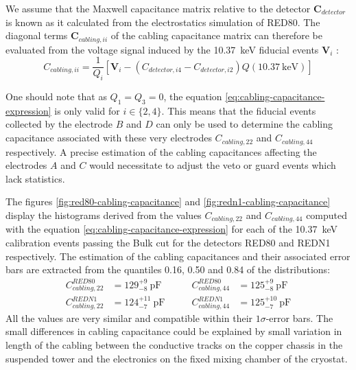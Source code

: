 We assume that the Maxwell capacitance matrix relative to the detector $\bm{C}_{detector}$ is known as it calculated from the electrostatics simulation of RED80. The diagonal terms $\bm{C}_{cabling, ii}$ of the cabling capacitance matrix can therefore be evaluated from the voltage signal induced by the \SI{10.37}{\kilo\eV} fiducial events $\bm{V}_{i}$ :
\begin{equation}
\label{eq:cabling-capacitance-expression}
C_{cabling, ii}
=
\frac{1}{Q_i} \left[ \bm{V}_{i} - \left( C_{detector, i4} - C_{detector, i2} \right) Q(\SI{10.37}{\kilo\eV}) \right]
\end{equation}

One should note that as $Q_1 = Q_3 = 0$, the equation \ref{eq:cabling-capacitance-expression} is only valid for $i \in \{ 2,4 \}$. This means that the fiducial events collected by the electrode $B$ and $D$ can only be used to determine the cabling capacitance associated with these very electrodes $C_{cabling, 22}$ and $C_{cabling, 44}$ respectively. A precise estimation of the cabling capacitances affecting the electrodes $A$ and $C$ would necessitate to adjust the veto or guard events which lack statistics.

The figures \ref{fig:red80-cabling-capacitance} and \ref{fig:redn1-cabling-capacitance} display the histograms derived from the values $C_{cabling, 22}$ and $C_{cabling, 44}$ computed with the equation \ref{eq:cabling-capacitance-expression} for each of the \SI{10.37}{\kilo\eV} calibration events passing the Bulk cut for the detectors RED80 and REDN1 respectively. The estimation of the cabling capacitances and their associated error bars are extracted from the quantiles 0.16, 0.50 and 0.84 of the distributions:
\begin{align}
C_{cabling, 22}^{RED80} &= 129_{-8}^{+9} \ \si{\pico\farad}
\quad \quad 
& C_{cabling, 44}^{RED80} &= 125_{-8}^{+9} \ \si{\pico\farad}
\\
C_{cabling, 22}^{REDN1} &= 124_{-7}^{+11} \ \si{\pico\farad}
\quad \quad 
& C_{cabling, 44}^{REDN1} &= 125_{-7}^{+10} \ \si{\pico\farad}
\end{align}
All the values are very similar and compatible within their $1\sigma$-error bars. The small differences in cabling capacitance could be explained by small variation in length of the cabling between the conductive tracks on the copper chassis in the suspended tower and the electronics on the fixed mixing chamber of the cryostat.

